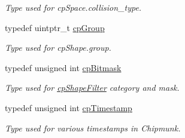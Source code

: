\begin{DoxyCompactItemize}
\begin{DoxyCompactList}\small\item\em Type used for cp\+Space.\+collision\+\_\+type. \end{DoxyCompactList}\item 
\hypertarget{group__basic_types_gacd811b1135a8f4a3e5cc019552b18b1a}{}typedef uintptr\+\_\+t \hyperlink{group__basic_types_gacd811b1135a8f4a3e5cc019552b18b1a}{cp\+Group}\label{group__basic_types_gacd811b1135a8f4a3e5cc019552b18b1a}

\begin{DoxyCompactList}\small\item\em Type used for cp\+Shape.\+group. \end{DoxyCompactList}\item 
\hypertarget{group__basic_types_gae7ff94f62e00cae288c1991958822743}{}typedef unsigned int \hyperlink{group__basic_types_gae7ff94f62e00cae288c1991958822743}{cp\+Bitmask}\label{group__basic_types_gae7ff94f62e00cae288c1991958822743}

\begin{DoxyCompactList}\small\item\em Type used for \hyperlink{structcp_shape_filter}{cp\+Shape\+Filter} category and mask. \end{DoxyCompactList}\item 
\hypertarget{group__basic_types_gaa24652c104082d0725066ea5ac7dc83f}{}typedef unsigned int \hyperlink{group__basic_types_gaa24652c104082d0725066ea5ac7dc83f}{cp\+Timestamp}\label{group__basic_types_gaa24652c104082d0725066ea5ac7dc83f}

\begin{DoxyCompactList}\small\item\em Type used for various timestamps in Chipmunk. \end{DoxyCompactList}\end{DoxyCompactItemize}
